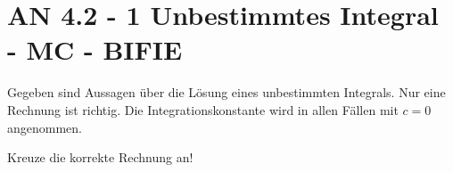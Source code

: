 \section{AN 4.2 - 1 Unbestimmtes Integral - MC - BIFIE}

\begin{beispiel}[AN 4.2]{1} %
				Gegeben sind Aussagen über die Lösung eines unbestimmten Integrals. Nur eine Rechnung ist richtig. Die Integrationskonstante wird in allen Fällen mit $c=0$ angenommen.
				
				Kreuze die korrekte Rechnung an!
\end{beispiel}